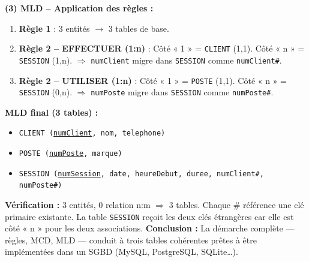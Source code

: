 \documentclass[11pt]{article}
\begin{document}
\begin{exoresolu}
\textbf{(3) MLD -- Application des règles :}
\begin{enumerate}
\item \textbf{Règle 1} : 3 entités $\to$ 3 tables de base.
\item \textbf{Règle 2 -- EFFECTUER (1:n)} : Côté « 1 » = \texttt{CLIENT} (1,1). Côté « n » = \texttt{SESSION} (1,n).
$\Rightarrow$ \texttt{numClient} migre dans \texttt{SESSION} comme \texttt{numClient\#}.
\item \textbf{Règle 2 -- UTILISER (1:n)} : Côté « 1 » = \texttt{POSTE} (1,1). Côté « n » = \texttt{SESSION} (0,n).
$\Rightarrow$ \texttt{numPoste} migre dans \texttt{SESSION} comme \texttt{numPoste\#}.
\end{enumerate}
\textbf{MLD final (3 tables) :}
\begin{itemize}
\item \texttt{CLIENT (\underline{numClient}, nom, telephone)}
\item \texttt{POSTE (\underline{numPoste}, marque)}
\item \texttt{SESSION (\underline{numSession}, date, heureDebut, duree, numClient\#, numPoste\#)}
\end{itemize}
\textbf{Vérification :} 3 entités, 0 relation n:m $\Rightarrow$ 3 tables. Chaque \# référence une clé primaire existante. La table \texttt{SESSION} reçoit les deux clés étrangères car elle est côté « n » pour les deux associations.
\textbf{Conclusion :} La démarche complète — règles, MCD, MLD — conduit à trois tables cohérentes prêtes à être implémentées dans un SGBD (MySQL, PostgreSQL, SQLite\ldots).
\end{exoresolu}
\end{document}
